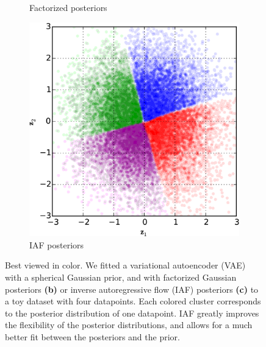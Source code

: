\documentclass[MAL,biber]{nowfnt} %
\begin{document}
\begin{figure}[t]
\begin{subfigure}[]{0.33\textwidth}
		\caption{Factorized posteriors}
	\end{subfigure}%
	\begin{subfigure}[]{0.33\textwidth}
		\centering
		\includegraphics[width=1\textwidth]{figures/iaf/xor_vae-iaf.png}
		\caption{IAF posteriors}
	\end{subfigure}%
	\caption{Best viewed in color. We fitted a variational autoencoder (VAE) with a spherical Gaussian prior, and with factorized Gaussian posteriors \textbf{(b)} or inverse autoregressive flow (IAF) posteriors \textbf{(c)} to a toy dataset with four datapoints. Each colored cluster corresponds to the posterior distribution of one datapoint. IAF greatly improves the flexibility of the posterior distributions, and allows for a much better fit between the posteriors and the prior.}
	\label{fig:xor}
\end{figure}
\end{document}
